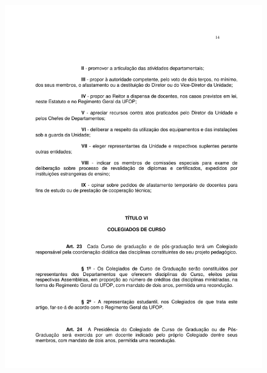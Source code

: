 \begin{figure}[p]
	\centering 
	\includegraphics[scale=0.7]{capitulos/resolucoes/cuni414/cuni414-14.pdf}
\end{figure} \pagebreak

